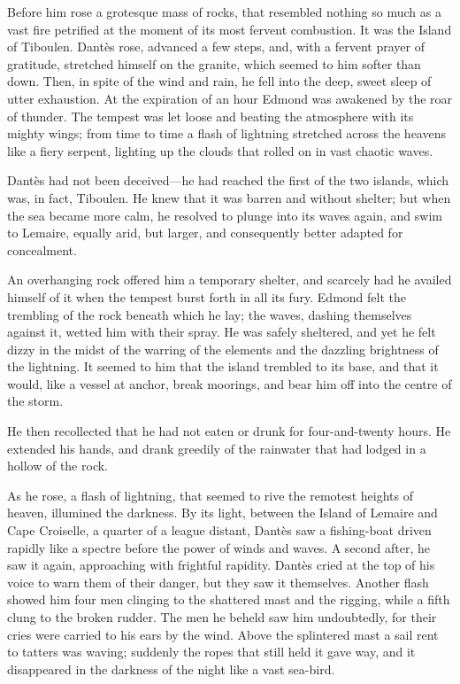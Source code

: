  Before him rose a grotesque mass of rocks, that resembled nothing so much as a vast fire petrified at the moment of its most fervent combustion. It was the Island of Tiboulen. Dantès rose, advanced a few steps, and, with a fervent prayer of gratitude, stretched himself on the granite, which seemed to him softer than down. Then, in spite of the wind and rain, he fell into the deep, sweet sleep of utter exhaustion. At the expiration of an hour Edmond was awakened by the roar of thunder. The tempest was let loose and beating the atmosphere with its mighty wings; from time to time a flash of lightning stretched across the heavens like a fiery serpent, lighting up the clouds that rolled on in vast chaotic waves. 

 Dantès had not been deceived—he had reached the first of the two islands, which was, in fact, Tiboulen. He knew that it was barren and without shelter; but when the sea became more calm, he resolved to plunge into its waves again, and swim to Lemaire, equally arid, but larger, and consequently better adapted for concealment. 

 An overhanging rock offered him a temporary shelter, and scarcely had he availed himself of it when the tempest burst forth in all its fury. Edmond felt the trembling of the rock beneath which he lay; the waves, dashing themselves against it, wetted him with their spray. He was safely sheltered, and yet he felt dizzy in the midst of the warring of the elements and the dazzling brightness of the lightning. It seemed to him that the island trembled to its base, and that it would, like a vessel at anchor, break moorings, and bear him off into the centre of the storm. 

 He then recollected that he had not eaten or drunk for four-and-twenty hours. He extended his hands, and drank greedily of the rainwater that had lodged in a hollow of the rock. 

 As he rose, a flash of lightning, that seemed to rive the remotest heights of heaven, illumined the darkness. By its light, between the Island of Lemaire and Cape Croiselle, a quarter of a league distant, Dantès saw a fishing-boat driven rapidly like a spectre before the power of winds and waves. A second after, he saw it again, approaching with frightful rapidity. Dantès cried at the top of his voice to warn them of their danger, but they saw it themselves. Another flash showed him four men clinging to the shattered mast and the rigging, while a fifth clung to the broken rudder. The men he beheld saw him undoubtedly, for their cries were carried to his ears by the wind. Above the splintered mast a sail rent to tatters was waving; suddenly the ropes that still held it gave way, and it disappeared in the darkness of the night like a vast sea-bird. 

